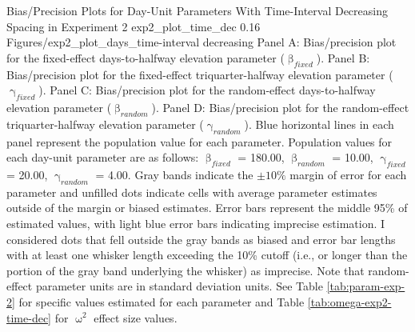 \documentclass[
12pt, %
twoside,
english]{guelphthesis}
\begin{document}
\begin{apaFigure}
[portrait]
[samepage]
[-0.2cm]
{Bias/Precision Plots for Day-Unit Parameters With Time-Interval Decreasing Spacing in Experiment 2}
{exp2_plot_time_dec}
{0.16}
{Figures/exp2_plot_days_time-interval decreasing}
{Panel A: Bias/precision plot for the fixed-effect days-to-halfway elevation parameter ($\upbeta_{fixed}$). Panel B: Bias/precision plot for the fixed-effect triquarter-halfway elevation parameter ($\upgamma_{fixed}$). Panel C: Bias/precision plot for the random-effect days-to-halfway elevation parameter ($\upbeta_{random}$). Panel D: Bias/precision plot for the random-effect triquarter-halfway elevation parameter ($\upgamma_{random}$). Blue horizontal lines in each panel represent the population value for each parameter. Population values for each day-unit parameter are as follows: $\upbeta_{fixed}$ = 180.00, $\upbeta_{random}$ = 10.00, $\upgamma_{fixed}$ = 20.00, $\upgamma_{random}$ = 4.00. Gray bands indicate the $\pm 10\%$ margin of error for each parameter and unfilled dots indicate cells with average parameter estimates outside of the margin or biased estimates. Error bars represent the middle 95\% of estimated values, with light blue error bars indicating imprecise estimation. I considered dots that fell outside the gray bands as biased and error bar lengths with at least one whisker length exceeding the 10\% cutoff (i.e., or longer than the portion of the gray band underlying the whisker) as imprecise. Note that random-effect parameter units are in standard deviation units. See Table \ref{tab:param-exp-2} for specific values estimated for each parameter and Table \ref{tab:omega-exp2-time-dec} for $\upomega^2$ effect size values.}
\end{apaFigure}
\end{document}
